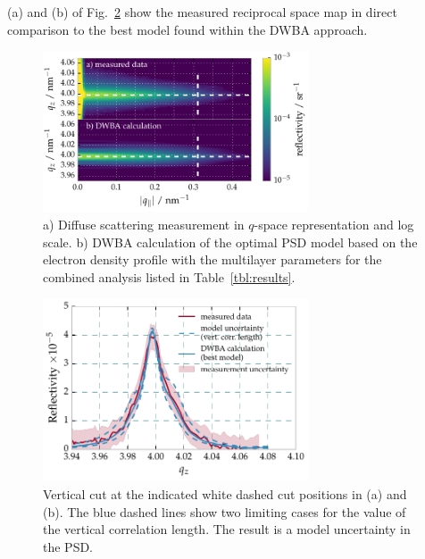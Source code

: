 (a) and (b) of Fig.~\ref{fig:diffuse_meas} show the measured reciprocal space 
map in direct comparison to the best model found within the DWBA approach.
\onecolumn
\begin{figure}[htbp]
  \centering
  \includegraphics[width=0.7\textwidth]{img/CrSc_diffuse_measured_vs_dwba}
  \caption{a) Diffuse scattering measurement in $q$-space representation and 
log scale. b) DWBA calculation of the optimal PSD model based on the electron 
density profile with the multilayer parameters for the combined analysis listed 
in Table~\ref{tbl:results}.}
  \label{fig:diffuse_meas}
\end{figure}

\begin{figure}[htbp]
  \centering
  \includegraphics[width=0.7\textwidth]{img/CrSc_diffuse_vertical_correlation}
  \caption{ Vertical cut at the indicated white dashed cut 
positions in (a) and (b). The blue dashed lines show two limiting cases for the 
value of the vertical correlation length. The result is a model uncertainty in 
the PSD.}
  \label{fig:diffuse_meas}
\end{figure}


